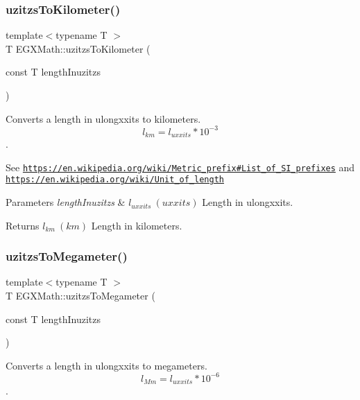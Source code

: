 \subsubsection{\texorpdfstring{uzitzs\+To\+Kilometer()}{uzitzsToKilometer()}}
{\footnotesize\ttfamily template$<$typename T $>$ \\
T E\+G\+X\+Math\+::uzitzs\+To\+Kilometer (\begin{DoxyParamCaption}\item[{const T}]{length\+Inuzitzs }\end{DoxyParamCaption})}



Converts a length in ulongxxits to kilometers. \[ l_{km}=l_{uxxits} * 10^{-3} \]. 

See \href{https://en.wikipedia.org/wiki/Metric_prefix#List_of_SI_prefixes}{\tt https\+://en.\+wikipedia.\+org/wiki/\+Metric\+\_\+prefix\#\+List\+\_\+of\+\_\+\+S\+I\+\_\+prefixes} and \href{https://en.wikipedia.org/wiki/Unit_of_length}{\tt https\+://en.\+wikipedia.\+org/wiki/\+Unit\+\_\+of\+\_\+length} 
\begin{DoxyParams}{Parameters}
{\em length\+Inuzitzs} & $ l_{uxxits}\ (uxxits)$ Length in ulongxxits. \\
\hline
\end{DoxyParams}
\begin{DoxyReturn}{Returns}
$ l_{km}\ (km)$ Length in kilometers. 
\end{DoxyReturn}
\mbox{\label{group___e_g_x_math-_conversions-_length_conversions-uzitzs-_s_i_ga237ffeef9137de3dd2cf5ae0eacf973e}} 
\subsubsection{\texorpdfstring{uzitzs\+To\+Megameter()}{uzitzsToMegameter()}}
{\footnotesize\ttfamily template$<$typename T $>$ \\
T E\+G\+X\+Math\+::uzitzs\+To\+Megameter (\begin{DoxyParamCaption}\item[{const T}]{length\+Inuzitzs }\end{DoxyParamCaption})}



Converts a length in ulongxxits to megameters. \[ l_{Mm}=l_{uxxits} * 10^{-6} \]. 

